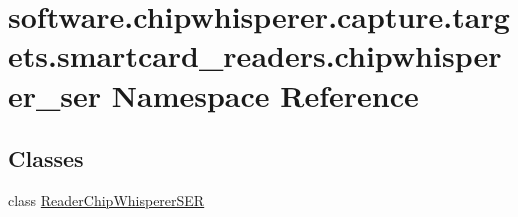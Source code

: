\hypertarget{namespacesoftware_1_1chipwhisperer_1_1capture_1_1targets_1_1smartcard__readers_1_1chipwhisperer__ser}{}\section{software.\+chipwhisperer.\+capture.\+targets.\+smartcard\+\_\+readers.\+chipwhisperer\+\_\+ser Namespace Reference}
\label{namespacesoftware_1_1chipwhisperer_1_1capture_1_1targets_1_1smartcard__readers_1_1chipwhisperer__ser}
\subsection*{Classes}
\begin{DoxyCompactItemize}
\item 
class \hyperlink{classsoftware_1_1chipwhisperer_1_1capture_1_1targets_1_1smartcard__readers_1_1chipwhisperer__ser_1_1ReaderChipWhispererSER}{Reader\+Chip\+Whisperer\+S\+E\+R}
\end{DoxyCompactItemize}
